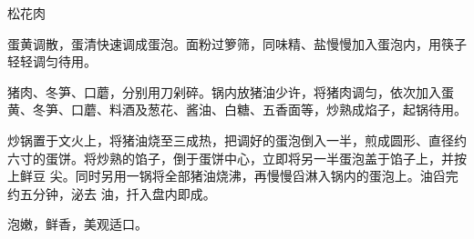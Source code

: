 \begin{recipe}{松花肉}

\ingredients


\preparation

\step 蛋黄调散，蛋清快速调成蛋泡。面粉过箩筛，同味精、盐慢慢加入蛋泡内，用筷子
轻轻调匀待用。

\step 猪肉、冬笋、口蘑，分别用刀剁碎。锅内放猪油少许，将猪肉调匀，依次加入蛋
黄、冬笋、口蘑、料酒及葱花、酱油、白糖、五香面等，炒熟成焰子，起锅待用。

\step 炒锅置于文火上，将猪油烧至三成热，把调好的蛋泡倒入一半，煎成圆形、直径约
六寸的蛋饼。将炒熟的馅子，倒于蛋饼中心，立即将另一半蛋泡盖于馅子上，并按上鲜豆
尖。同时另用一锅将全部猪油烧沸，再慢慢舀淋入锅内的蛋泡上。油舀完约五分钟，泌去
油，扦入盘内即成。

\features

泡嫩，鲜香，美观适口。

\end{recipe}

